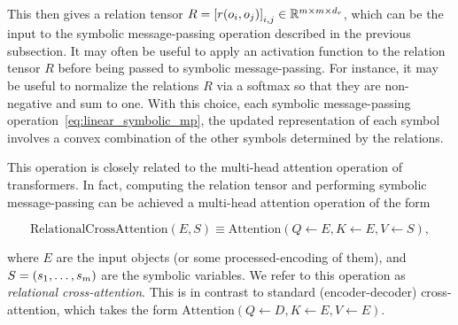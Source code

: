 This then gives a relation tensor $R = \left[r(o_i, o_j)\right]_{i,j} \in \mathbb{R}^{m \times m \times d_r}$, which can be the input to the symbolic message-passing operation described in the previous subsection. It may often be useful to apply an activation function to the relation tensor $R$ before being passed to symbolic message-passing. For instance, it may be useful to normalize the relations $R$ via a softmax so that they are non-negative and sum to one. With this choice, each symbolic message-passing operation~\cref{eq:linear_symbolic_mp}, the updated representation of each symbol involves a convex combination of the other symbols determined by the relations.

This operation is closely related to the multi-head attention operation of transformers. In fact, computing the relation tensor and performing symbolic message-passing can be achieved a multi-head attention operation of the form

\begin{equation}\label{eq:relation_crossattention}
    \text{RelationalCrossAttention}\left(E, S\right) \equiv \text{Attention}\left( Q \gets E, K \gets E, V \gets S \right),
\end{equation}

where $E$ are the input objects (or some processed-encoding of them), and $S = (s_1, \ldots, s_m)$ are the symbolic variables. We refer to this operation as \textit{relational cross-attention}. This is in contrast to standard (encoder-decoder) cross-attention, which takes the form $\text{Attention}\left( Q \gets D, K \gets E, V \gets E \right)$.




